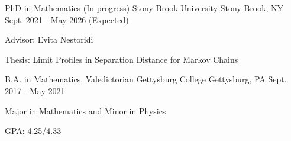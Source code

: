 
\begin{cventries}

	\cventryedu
		{PhD in Mathematics (In progress)} %
		{Stony Brook University} %
		{Stony Brook, NY} %
		{Sept. 2021 - May 2026 (Expected)} %
		{ %
			\begin{cvitems}
				\item Advisor: Evita Nestoridi
				\item Thesis: Limit Profiles in Separation Distance for Markov Chains
			\end{cvitems}
		}

	\cventryedu
		{B.A. in Mathematics, Valedictorian} %
		{Gettysburg College} %
		{Gettysburg, PA} %
		{Sept. 2017 - May 2021} %
		{ %
			\begin{cvitems}
				\item Major in Mathematics and Minor in Physics
				\item GPA: 4.25/4.33
			\end{cvitems}
		}

\end{cventries}
